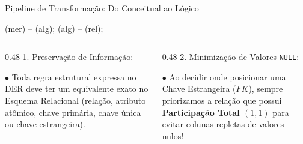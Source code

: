 \begin{frame}{Pipeline de Transformação: Do Conceitual ao Lógico}
\begin{center}
{       (mer) -- (alg);
       (alg) -- (rel);
    }
  \end{center}
  \vspace{0.05cm}
  \begin{columns}[t]
    \begin{column}{0.48\textwidth}
      \footnotesize\alert{1. Preservação de Informação:}\par
      \scriptsize
      $\bullet$ Toda regra estrutural expressa no DER deve ter um equivalente exato no Esquema Relacional (relação, atributo atômico, chave primária, chave única ou chave estrangeira).
    \end{column}
    \begin{column}{0.48\textwidth}
      \footnotesize\alert{2. Minimização de Valores \texttt{NULL}:}\par
      \scriptsize
      $\bullet$ Ao decidir onde posicionar uma Chave Estrangeira ($FK$), sempre priorizamos a relação que possui \textbf{Participação Total $(1, 1)$} para evitar colunas repletas de valores nulos!
    \end{column}
  \end{columns}
\end{frame}

